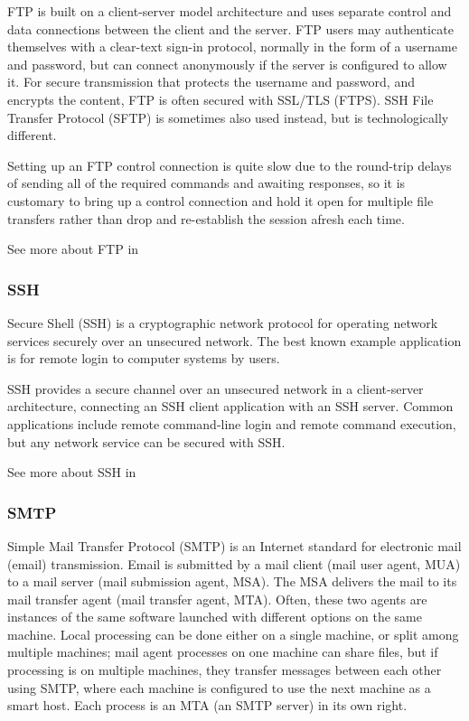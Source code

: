 FTP is built on a client-server model architecture and uses separate control and data connections between the client and the server. FTP users may authenticate themselves with a clear-text sign-in protocol, normally in the form of a username and password, but can connect anonymously if the server is configured to allow it. For secure transmission that protects the username and password, and encrypts the content, FTP is often secured with SSL/TLS (FTPS). SSH File Transfer Protocol (SFTP) is sometimes also used instead, but is technologically different.

Setting up an FTP control connection is quite slow due to the round-trip delays of sending all of the required commands and awaiting responses, so it is customary to bring up a control connection and hold it open for multiple file transfers rather than drop and re-establish the session afresh each time. 

See more about FTP in \cite{FTP}

\subsubsection{SSH} 
Secure Shell (SSH) is a cryptographic network protocol for operating network services securely over an unsecured network. The best known example application is for remote login to computer systems by users.

SSH provides a secure channel over an unsecured network in a client-server architecture, connecting an SSH client application with an SSH server. Common applications include remote command-line login and remote command execution, but any network service can be secured with SSH. 

See more about SSH in \cite{SSH}

\subsubsection{SMTP}
Simple Mail Transfer Protocol (SMTP) is an Internet standard for electronic mail (email) transmission. Email is submitted by a mail client (mail user agent, MUA) to a mail server (mail submission agent, MSA). The MSA delivers the mail to its mail transfer agent (mail transfer agent, MTA). Often, these two agents are instances of the same software launched with different options on the same machine. Local processing can be done either on a single machine, or split among multiple machines; mail agent processes on one machine can share files, but if processing is on multiple machines, they transfer messages between each other using SMTP, where each machine is configured to use the next machine as a smart host. Each process is an MTA (an SMTP server) in its own right.

